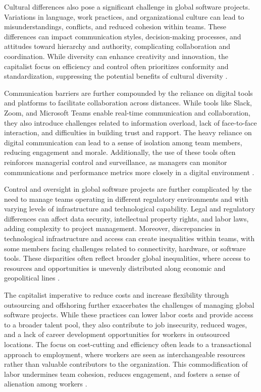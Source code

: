\begin{refsection}
Cultural differences also pose a significant challenge in global software projects. Variations in language, work practices, and organizational culture can lead to misunderstandings, conflicts, and reduced cohesion within teams. These differences can impact communication styles, decision-making processes, and attitudes toward hierarchy and authority, complicating collaboration and coordination. While diversity can enhance creativity and innovation, the capitalist focus on efficiency and control often prioritizes conformity and standardization, suppressing the potential benefits of cultural diversity \cite[pp.~45-48]{Carmel1998GlobalSoftwareTeams}.

Communication barriers are further compounded by the reliance on digital tools and platforms to facilitate collaboration across distances. While tools like Slack, Zoom, and Microsoft Teams enable real-time communication and collaboration, they also introduce challenges related to information overload, lack of face-to-face interaction, and difficulties in building trust and rapport. The heavy reliance on digital communication can lead to a sense of isolation among team members, reducing engagement and morale. Additionally, the use of these tools often reinforces managerial control and surveillance, as managers can monitor communications and performance metrics more closely in a digital environment \cite[pp.~205-208]{Ebert2011GlobalSoftwareIT}.

Control and oversight in global software projects are further complicated by the need to manage teams operating in different regulatory environments and with varying levels of infrastructure and technological capability. Legal and regulatory differences can affect data security, intellectual property rights, and labor laws, adding complexity to project management. Moreover, discrepancies in technological infrastructure and access can create inequalities within teams, with some members facing challenges related to connectivity, hardware, or software tools. These disparities often reflect broader global inequalities, where access to resources and opportunities is unevenly distributed along economic and geopolitical lines \cite[pp.~57-59]{Mockus2001GlobalDevelopment}.

The capitalist imperative to reduce costs and increase flexibility through outsourcing and offshoring further exacerbates the challenges of managing global software projects. While these practices can lower labor costs and provide access to a broader talent pool, they also contribute to job insecurity, reduced wages, and a lack of career development opportunities for workers in outsourced locations. The focus on cost-cutting and efficiency often leads to a transactional approach to employment, where workers are seen as interchangeable resources rather than valuable contributors to the organization. This commodification of labor undermines team cohesion, reduces engagement, and fosters a sense of alienation among workers \cite[pp.~112-115]{Sahay2003GlobalITOutsourcing}.


\end{refsection}
